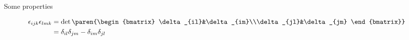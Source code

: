 Some properties 

\begin{align}
	\epsilon_{ijk}\epsilon_{lmk} &= \det\paren{\begin{bmatrix}
\delta_{il}&\delta_{im}\\\delta_{jl}&\delta_{jm}
\end{bmatrix}} \\
	&= \delta_{il}\delta_{jm} - \delta_{im}\delta_{jl}
\end{align}
